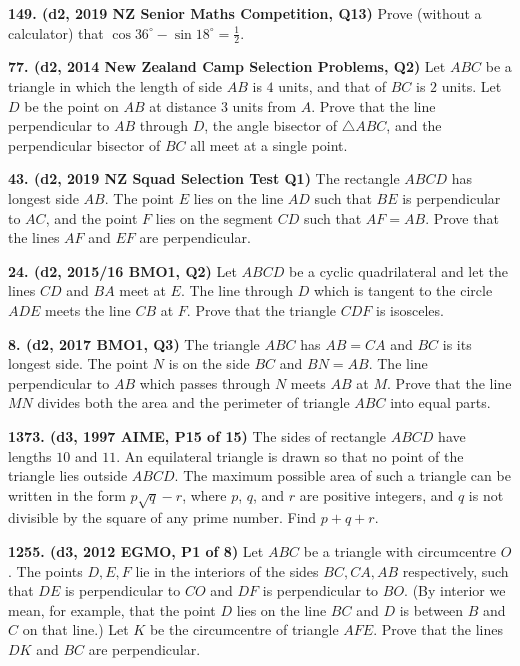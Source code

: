 \documentclass{article}
\begin{document}
\textbf{149. (\color{red}d2\color{black}, 2019 NZ Senior Maths Competition, Q13)} Prove (without a calculator) that $\cos 36^{\circ} - \sin 18^{\circ} = \frac12$.

\textbf{77. (\color{red}d2\color{black}, 2014 New Zealand Camp Selection Problems, Q2)} Let $ABC$ be a triangle in which the length of side $AB$ is $4$ units, and that of $BC$ is $2$ units. Let $D$ be the point on $AB$ at distance $3$ units from $A$. Prove that the line perpendicular to $AB$ through $D$, the angle bisector of $\triangle ABC$, and the perpendicular bisector of $BC$ all meet at a single point.

\textbf{43. (\color{red}d2\color{black}, 2019 NZ Squad Selection Test Q1)} The rectangle $ABCD$ has longest side $AB$. The point $E$ lies on the line $AD$ such that $BE$ is perpendicular to $AC$, and the point $F$ lies on the segment $CD$ such that $AF = AB$.
Prove that the lines $AF$ and $EF$ are perpendicular.

\textbf{24. (\color{red}d2\color{black}, 2015/16 BMO1, Q2)} Let $ABCD$ be a cyclic quadrilateral and let the lines $CD$ and $BA$ meet at $E$. The line through $D$ which is tangent to the circle $ADE$ meets the line $CB$ at $F$. Prove that the triangle $CDF$ is isosceles.

\textbf{8. (\color{red}d2\color{black}, 2017 BMO1, Q3)} The triangle $ABC$ has $AB = CA$ and $BC$ is its longest side. The point $N$ is on the side $BC$ and $BN = AB$. The line perpendicular to $AB$ which passes through $N$ meets $AB$ at $M$. Prove that the line $MN$ divides both the area and the perimeter of triangle $ABC$ into equal parts.

\textbf{1373. (\color{red}d3\color{black}, 1997 AIME, P15 of 15)} The sides of rectangle $ABCD$ have lengths $10$ and $11$. An equilateral triangle is drawn so that no point of the triangle lies outside $ABCD$. The maximum possible area of such a triangle can be written in the form $p\sqrt{q}-r$, where $p$, $q$, and $r$ are positive integers, and $q$ is not divisible by the square of any prime number. Find $p+q+r$.

\textbf{1255. (\color{red}d3\color{black}, 2012 EGMO, P1 of 8)} Let $ABC$ be a triangle with circumcentre $O$. The points $D,E,F$ lie in the interiors of the sides $BC,CA,AB$ respectively, such that $DE$ is perpendicular to $CO$ and $DF$ is perpendicular to $BO$. (By interior we mean, for example, that the point $D$ lies on the line $BC$ and $D$ is between $B$ and $C$ on that line.)
Let $K$ be the circumcentre of triangle $AFE$. Prove that the lines $DK$ and $BC$ are perpendicular.
\end{document}
